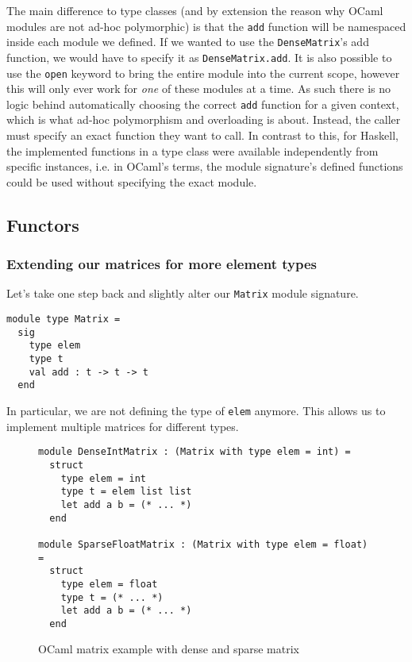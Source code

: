 The main difference to type classes (and by extension the reason why OCaml modules are not ad-hoc polymorphic) is that the \verb|add| function will be namespaced inside each module we defined. If we wanted to use the \verb|DenseMatrix|'s add function, we would have to specify it as \verb|DenseMatrix.add|. It is also possible to use the \verb|open| keyword to bring the entire module into the current scope, however this will only ever work for \textit{one} of these modules at a time. As such there is no logic behind automatically choosing the correct \verb|add| function for a given context, which is what ad-hoc polymorphism and overloading is about. Instead, the caller must specify an exact function they want to call. In contrast to this, for Haskell, the implemented functions in a type class were available independently from specific instances, i.e. in OCaml's terms, the module signature's defined functions could be used without specifying the exact module.

\subsection{Functors}

\subsubsection{Extending our matrices for more element types}

Let's take one step back and slightly alter our \verb|Matrix| module signature.
\begin{verbatim}
module type Matrix =
  sig
    type elem
    type t
    val add : t -> t -> t
  end
\end{verbatim}
In particular, we are not defining the type of \verb|elem| anymore. This allows us to implement multiple matrices for different types.

\begin{figure*}
\begin{verbatim}
module DenseIntMatrix : (Matrix with type elem = int) =
  struct
    type elem = int
    type t = elem list list
    let add a b = (* ... *)
  end

module SparseFloatMatrix : (Matrix with type elem = float) =
  struct
    type elem = float
    type t = (* ... *)
    let add a b = (* ... *)
  end
\end{verbatim}
\caption{OCaml matrix example with dense and sparse matrix}
\label{ocaml-all-matrix}
\end{figure*}

